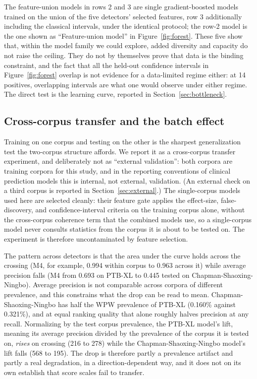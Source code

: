 \documentclass[11pt]{article}
\begin{document}
The feature-union models in rows 2 and 3 are single gradient-boosted models trained on the union of the five detectors' selected features, row 3 additionally including the classical intervals, under the identical protocol; the row-2 model is the one shown as ``Feature-union model'' in Figure~\ref{fig:forest}. These five show that, within the model family we could explore, added diversity and capacity do not raise the ceiling. They do not by themselves prove that data is the binding constraint, and the fact that all the held-out confidence intervals in Figure~\ref{fig:forest} overlap is not evidence for a data-limited regime either: at 14 positives, overlapping intervals are what one would observe under either regime. The direct test is the learning curve, reported in Section~\ref{sec:bottleneck}.

\subsection{Cross-corpus transfer and the batch effect}
\label{sec:batch}

Training on one corpus and testing on the other is the sharpest generalization test the two-corpus structure affords. We report it as a cross-corpus transfer experiment, and deliberately not as ``external validation'': both corpora are training corpora for this study, and in the reporting conventions of clinical prediction models this is internal, not external, validation. (An external check on a third corpus is reported in Section~\ref{sec:external}.) The single-corpus models used here are selected cleanly: their feature gate applies the effect-size, false-discovery, and confidence-interval criteria on the training corpus alone, without the cross-corpus coherence term that the combined models use, so a single-corpus model never consults statistics from the corpus it is about to be tested on. The experiment is therefore uncontaminated by feature selection.

The pattern across detectors is that the area under the curve holds across the crossing (M4, for example, 0.994 within corpus to 0.963 across it) while average precision falls (M4 from 0.693 on PTB-XL to 0.445 tested on Chapman-Shaoxing-Ningbo). Average precision is not comparable across corpora of different prevalence, and this constrains what the drop can be read to mean. Chapman-Shaoxing-Ningbo has half the WPW prevalence of PTB-XL (0.160\% against 0.321\%), and at equal ranking quality that alone roughly halves precision at any recall. Normalizing by the test corpus prevalence, the PTB-XL model's lift, meaning its average precision divided by the prevalence of the corpus it is tested on, \emph{rises} on crossing (216 to 278) while the Chapman-Shaoxing-Ningbo model's lift falls (568 to 195). The drop is therefore partly a prevalence artifact and partly a real degradation, in a direction-dependent way, and it does not on its own establish that score scales fail to transfer.
\end{document}
